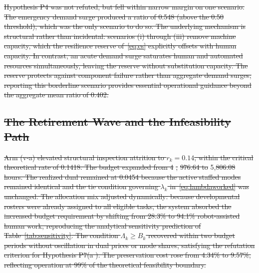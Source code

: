 \documentclass[utf8]{FrontiersinHarvard}
\providecommand{\DIFadd}[1]{{\protect\color{blue}\uwave{#1}}} %
\providecommand{\DIFdel}[1]{{\protect\color{red}\sout{#1}}}                      %
\providecommand{\DIFaddbegin}{} %
\providecommand{\DIFaddend}{} %
\providecommand{\DIFdelbegin}{} %
\providecommand{\DIFdelend}{} %
\begin{document}
\DIFdel{Hypothesis P4 was not refuted, but fell within narrow margin on one scenario. The emergency demand surge produced a ratio of 0.548 (above the 0.50 threshold), which was the only scenario to do so. The underlying mechanism is structural rather than incidental: scenarios (i) through (iii) remove machine capacity, which the resilience reserve of~\eqref{eq:cs} explicitly offsets with human capacity. In contrast, an acute demand surge saturates human and automated resources simultaneously, leaving the reserve without substitution capacity. The reserve protects against component failure rather than aggregate demand surges; reporting this borderline scenario provides essential operational guidance beyond the aggregate mean ratio of 0.402.
	}%

\subsection{\DIFdel{The Retirement Wave and the Infeasibility Path}}
\addtocounter{subsection}{-1}%

\DIFdel{Arm (v-a) elevated structural inspection attrition to $r_k = 0.14$, within the critical theoretical rate of 0.1418. The budget expanded from 4}%
\DIFdel{,}%
\DIFdel{976.64 to }\DIFdelend \DIFaddbegin \DIFadd{368 hours against the ceiling of }\DIFaddend 5{,}\DIFdelbegin \DIFdel{806.08 hours. The realized dual remained at 0.0454 because the active staffed modes remained identical and the tie condition governing $\lambda_k$ in~\eqref{eq:lambdaworked} was unchanged. The allocation mix adjusted dynamically: because developmental rosters were already assigned to all eligible tasks, the system absorbed the increased budget requirement by shifting from 28.3\% to 94.1\% robot-assisted human work, reproducing the analytical sensitivity prediction of Table~\ref{tab:sensitivity}. The condition $\Lambda_k \geq B_k$ recovered within two budget periods without oscillation in dual prices or mode shares, satisfying the refutation criterion for Hypothesis P7(a ). The preservation cost rose from 4.34\% to 9.57\%, reflecting operation at 99\% of the theoretical feasibility boundary.
	}%
\end{document}
